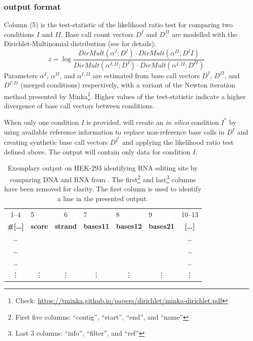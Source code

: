 \documentclass[10pt,a4paper,final]{article}
\begin{document}
\subsubsection{\call{*} output format}\label{sec:call_format}
Column (5) is the test-statistic of the likelihood ratio test for comparing two conditions $I$ and $II$. 
Base call count vectors $D^I$ and $D^{II}$ are modelled with the Dirichlet-Multinomial distribution 
(see \cite{Piechotta2017} for details):
$$z = \log \frac{DirMult(\alpha^I; D^I) \cdot DirMult(\alpha^{II}; D^II)}{DirMult(\alpha^{I,II}; D^I) \cdot DirMult(\alpha^{I,II}; D^{II})}$$
Parameters $\alpha^I$, $\alpha^{II}$, and $\alpha^{I,II}$ are estimated from base call vectors 
$D^I$, $D^{II}$, and $D^{I,II}$ (merged conditions) respectively, with a variant of the Newton 
iteration method presented by Minka\footnote{Check: \url{https://tminka.github.io/papers/dirichlet/minka-dirichlet.pdf}}.
Higher values of the test-statistic indicate a higher divergence of base call vectors between conditions.

When only one condition $I$ is provided,  will create an \textit{in silico} condition $I^*$ by 
using available reference information to replace non-reference base calls in $D^I$ and creating 
synthetic base call vectors $D^{I^*}$ and applying the likelihood ratio test defined above. The output 
will contain only data for condition $I$. 
\newcommand{\firstColumns}{First five columns: ``contig'', ``start'', ``end'', and ``name''}
\newcommand{\lastColumns}{Last 3 columns: ``info'', ``filter'', and ``ref''}
\newcommand{\cc}[1]{\multicolumn{1}{c}{#1}}
\begin{table}[ht]
  \centering
  \caption{Exemplary  output on HEK-293 identifying RNA editing site by comparing DNA and RNA from 
  \cite{Piechotta2017}. 
  The first\protect\footnote{\firstColumns} and last\protect\footnote{\lastColumns} columns have been 
  removed for clarity. The first column is used to identify a line in the presented output.}
  \label{tbl:call_output_format}
  \small{
  \begin{tabular}{clclllc}
    1--4                & 5              & 6               & 7                & 8                & 9                & 10--13 \\
    \textbf{\#[\ldots]} & \textbf{score} & \textbf{strand} & \textbf{bases11} & \textbf{bases12} & \textbf{bases21} & \textbf{[\ldots]} \\
    \hline
    \ldots &                &                 &                  &                  &                  & \ldots \\
    \ldots &                &                 &                  &                  &                  & \ldots \\
    \ldots &                &                 &                  &                  &                  & \ldots \\
    \vdots & \cc{\vdots}    & \vdots          & \cc{\vdots}      & \cc{\vdots}      & \cc{\vdots}      & \vdots \\
  \end{tabular}}
\end{table}
\end{document}
